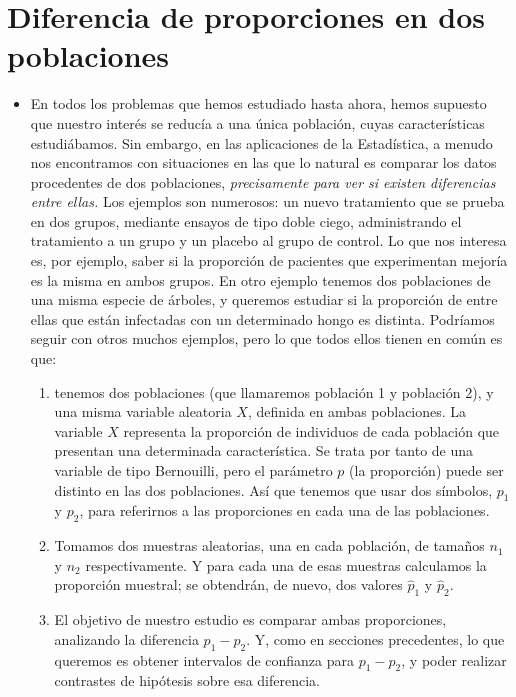 
\section{Diferencia de proporciones en dos poblaciones}

\begin{itemize}

    \item En todos los problemas que hemos estudiado hasta ahora, hemos supuesto que nuestro interés se reducía a una única población, cuyas características estudiábamos. Sin embargo, en las aplicaciones de la Estadística, a menudo nos encontramos con situaciones en las que lo natural es comparar los datos procedentes de dos poblaciones, {\em precisamente para ver si existen diferencias entre ellas.} Los ejemplos son numerosos: un nuevo tratamiento que se prueba en dos grupos, mediante ensayos de tipo doble ciego, administrando el tratamiento a un grupo y un placebo al grupo de control. Lo que nos interesa es, por ejemplo, saber si la proporción de pacientes que experimentan mejoría es la misma en ambos grupos. En otro ejemplo tenemos dos poblaciones de una misma especie de árboles, y queremos estudiar si la proporción de entre ellas que están infectadas con un determinado hongo es distinta. Podríamos seguir con otros muchos ejemplos, pero lo que todos ellos tienen en común es que:
        \begin{enumerate}
            \item tenemos dos poblaciones (que llamaremos población 1 y población 2), y una misma variable aleatoria $X$, definida en ambas poblaciones. La variable $X$ representa la proporción de individuos de cada población que presentan una determinada característica. Se trata por tanto de una variable de tipo Bernouilli, pero el parámetro $p$ (la proporción) puede ser distinto en las dos poblaciones. Así que tenemos que usar dos símbolos, $p_1$ y $p_2$, para referirnos a las proporciones en cada una de las poblaciones.
            \item Tomamos dos muestras aleatorias, una en cada población, de tamaños $n_1$ y $n_2$ respectivamente. Y para cada una de esas muestras calculamos la proporción muestral; se obtendrán, de nuevo, dos valores $\hat p_1$ y $\hat p_2$.
            \item El objetivo de nuestro estudio es comparar ambas proporciones, analizando la diferencia $p_1-p_2$. Y, como en secciones precedentes, lo que queremos es obtener intervalos de confianza para $p_1-p_2$, y poder realizar contrastes de hipótesis sobre esa diferencia.

\end{enumerate}
\end{itemize}
